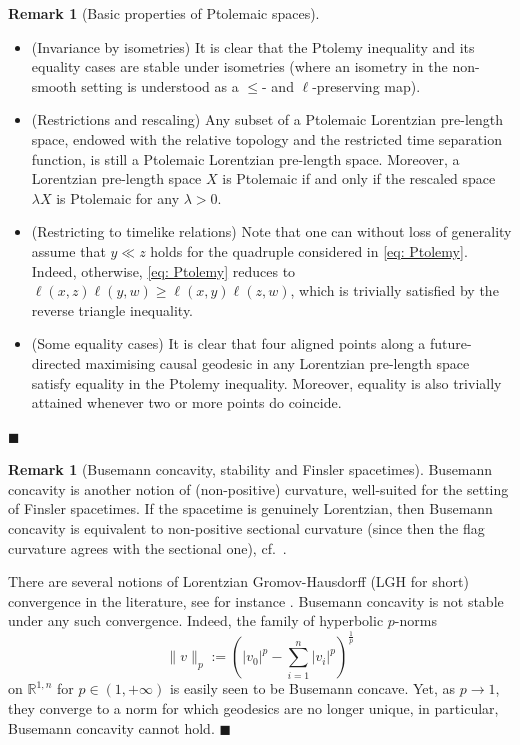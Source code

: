 \documentclass[hidelinks,12pt,a4paper]{article}
\numberwithin{equation}{section}
\theoremstyle{plain}
\theoremstyle{definition}
\newtheorem{remark}[definition]{Remark}
\newcommand{\LpLS}{Lo\-rentz\-ian pre-length space }
\newcommand{\LpLSn}{Lo\-rentz\-ian pre-length space}
\begin{document}
\begin{remark}[Basic properties of Ptolemaic spaces]
\label{rem: Ptolemy elem prop}
\mbox{}\par
\begin{itemize}
\item[(i)]
(Invariance by isometries) It is clear that the Ptolemy inequality and its equality cases are stable under isometries (where an isometry in the non-smooth setting is understood as a $\leq$- and $\ell$-preserving map). 

\item[(ii)] (Restrictions and rescaling) Any subset of a Ptolemaic \LpLSn, endowed with the relative topology and the restricted time separation function, is still a Ptolemaic \LpLSn. 
Moreover, a \LpLS $X$ is Ptolemaic if and only if the rescaled space $\lambda X$ is Ptolemaic for any $\lambda >0$.

\item[(iii)] (Restricting to timelike relations) Note that one can without loss of generality assume that $y \ll z$ holds for the quadruple considered in \eqref{eq: Ptolemy}. 
Indeed, otherwise, \eqref{eq: Ptolemy} reduces to $\ell(x,z)\ell(y,w) \geq \ell(x,y)\ell(z,w)$, which is trivially satisfied by the reverse triangle inequality. 

\item[(iv)] (Some equality cases) It is clear that four aligned points along a future-directed maximising causal geodesic in any \LpLS satisfy equality in the Ptolemy inequality. Moreover, equality is also trivially attained whenever two or more points do coincide.
\end{itemize}
\hfill$\blacksquare$ 
\end{remark}

\begin{remark}[Busemann concavity, stability and Finsler spacetimes]
Busemann concavity is another notion of (non-positive) curvature, well-suited for the setting of Finsler spacetimes. 
If the spacetime is genuinely Lorentzian, then Busemann concavity is equivalent to non-positive sectional curvature (since then the flag curvature agrees with the sectional one), cf.\ \cite{BEOR25+}. 

There are several notions of Lorentzian Gromov-Hausdorff (LGH for short) convergence in the literature, see for instance \cite{MinSuhr, MS}. Busemann concavity is not stable under any such convergence. 
Indeed, the family of hyperbolic $p$-norms 
\begin{equation*}
\|v\|_p:=\left(|v_0|^p - \sum_{i=1}^n|v_i|^p \right) ^{\frac1p}
\end{equation*}
on $\mathbb{R}^{1,n}$ for $p \in (1, + \infty)$ is easily seen to be Busemann concave. 
Yet, as $p \to 1$, they converge to a norm for which geodesics are no longer unique, in particular, Busemann concavity cannot hold. 
\hfill$\blacksquare$ 
\end{remark}
\end{document}

